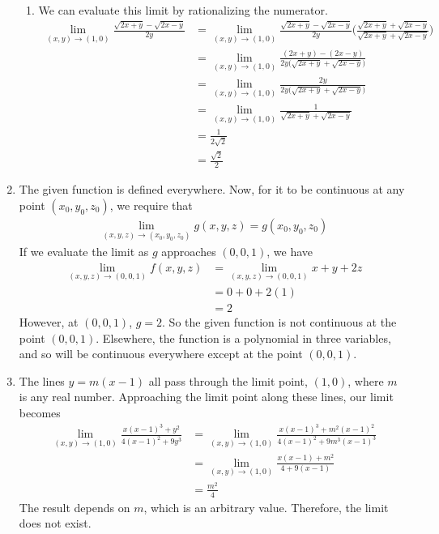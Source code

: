\documentclass{article}
\begin{document}
\begin{enumerate}
\begin{enumerate}
\item  We can evaluate this limit by rationalizing the numerator.
\begin{align*}
  \lim_{(x,y)\rightarrow(1,0) } \frac{\sqrt{2x+y}-\sqrt{2x-y}}{2y} &= 
  \lim_{(x,y)\rightarrow(1,0) } \frac{\sqrt{2x+y}-\sqrt{2x-y}}{2y} \Bigg(\frac{\sqrt{2x+y}+\sqrt{2x-y}}{\sqrt{2x+y}+\sqrt{2x-y}} \Bigg) \\
  &=\lim_{(x,y)\rightarrow(1,0) } \frac{(2x+y)-(2x-y)}{2y \Big(\sqrt{2x+y}+\sqrt{2x-y} \Big)}  \\
  &=\lim_{(x,y)\rightarrow(1,0) } \frac{2y}{2y \Big(\sqrt{2x+y}+\sqrt{2x-y} \Big)}  \\
  &=\lim_{(x,y)\rightarrow(1,0) } \frac{1}{\sqrt{2x+y}+\sqrt{2x-y} }  \\
  &= \frac{1}{2\sqrt{2} }\\
  &= \frac{\sqrt{2}}{2}
\end{align*}
\end{enumerate}
\item
The given function is defined everywhere. Now, for it to be continuous at any point $(x_0,y_0,z_0)$, we require that 
\begin{align*} 
   \lim_{(x,y,z)\rightarrow(x_0,y_0,z_0) } g(x,y,z) = g(x_0,y_0,z_0)
 \end{align*}
If we evaluate the limit as $g$ approaches $(0,0,1)$, we have
\begin{align*}
\lim_{(x,y,z)\rightarrow(0,0,1) } f(x,y,z) 
&= \lim_{(x,y,z)\rightarrow(0,0,1) } x+y+2z \\
&= 0+0+2(1) \\
&= 2
\end{align*}
However, at $(0,0,1)$, $g = 2$. So the given function is not continuous at the point $(0,0,1)$. Elsewhere, the function is a polynomial in three variables, and so will be continuous everywhere except at the point $(0,0,1)$. 
\item The lines $y=m(x-1)$ all pass through the limit point, $(1,0)$, where $m$ is any real number. Approaching the limit point along these lines, our limit becomes
\begin{align*} 
   \lim_{(x,y)\rightarrow(1,0) } \frac{x(x-1)^3 + y^2}{4(x-1)^2+9y^3} 
   &= \lim_{(x,y)\rightarrow(1,0) } \frac{x(x-1)^3 + m^2(x-1)^2}{4(x-1)^2+9m^3(x-1)^3} \\
   &= \lim_{(x,y)\rightarrow(1,0) } \frac{x(x-1) + m^2}{4+9(x-1)} \\
   &= \frac{m^2}{4}
 \end{align*}
 The result depends on $m$, which is an arbitrary value. Therefore, the limit does not exist. 


\end{enumerate}
\end{document}
